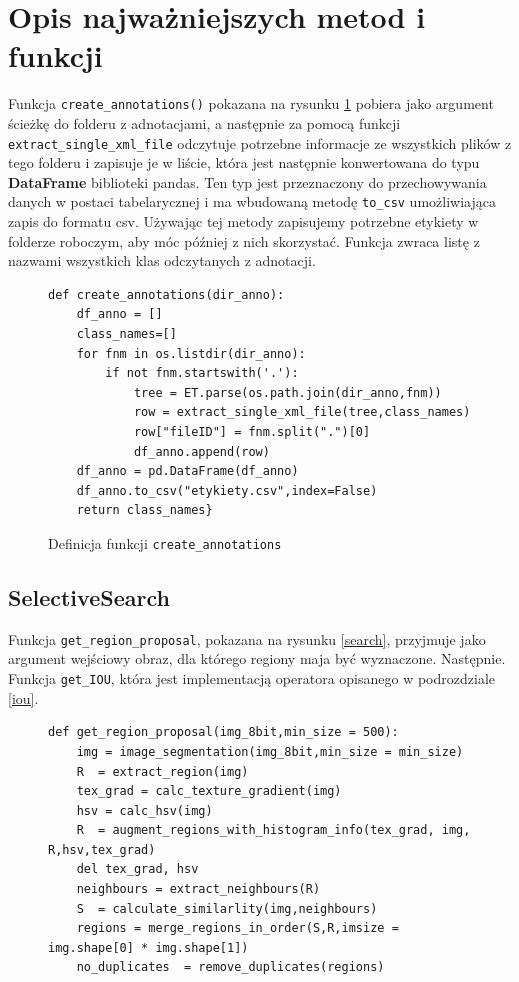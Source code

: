 \documentclass[a4paper,twoside,12pt]{book}
\begin{document}
{{\section{Opis najważniejszych metod i funkcji}
{ Funkcja \lstinline|create_annotations()| pokazana na rysunku \ref{dataprep} pobiera jako argument ścieżkę do folderu z adnotacjami, a następnie za pomocą funkcji \lstinline|extract_single_xml_file| odczytuje potrzebne informacje ze wszystkich plików z tego folderu  i zapisuje je w liście, która jest następnie konwertowana do typu \textbf{DataFrame} biblioteki pandas. Ten typ jest przeznaczony do przechowywania danych w postaci tabelarycznej i ma wbudowaną metodę \lstinline|to_csv| umożliwiająca zapis do formatu csv. Używając tej metody zapisujemy potrzebne etykiety w folderze roboczym, aby móc później z nich skorzystać. Funkcja zwraca listę z nazwami wszystkich klas odczytanych z adnotacji.}
\begin{figure}
\centering
\begin{lstlisting}
def create_annotations(dir_anno):
    df_anno = []
    class_names=[]
    for fnm in os.listdir(dir_anno):  
        if not fnm.startswith('.'):
            tree = ET.parse(os.path.join(dir_anno,fnm))
            row = extract_single_xml_file(tree,class_names)
            row["fileID"] = fnm.split(".")[0]
            df_anno.append(row)
    df_anno = pd.DataFrame(df_anno)
    df_anno.to_csv("etykiety.csv",index=False)
    return class_names}

\end{lstlisting}
\caption{Definicja funkcji \lstinline|create_annotations|}
\label{dataprep}
\end{figure}
\subsection{SelectiveSearch}
 Funkcja  \lstinline|get_region_proposal|, pokazana na rysunku \ref{search}, przyjmuje jako argument wejściowy obraz, dla którego regiony maja być wyznaczone. Następnie. Funkcja \lstinline|get_IOU|, która jest implementacją operatora opisanego w podrozdziale \ref{iou}.
}
\begin{figure}
\centering
\begin{lstlisting}
def get_region_proposal(img_8bit,min_size = 500):
    img = image_segmentation(img_8bit,min_size = min_size)
    R  = extract_region(img)    
    tex_grad = calc_texture_gradient(img)
    hsv = calc_hsv(img)
    R  = augment_regions_with_histogram_info(tex_grad, img, R,hsv,tex_grad)
    del tex_grad, hsv
    neighbours = extract_neighbours(R)
    S  = calculate_similarlity(img,neighbours)
    regions = merge_regions_in_order(S,R,imsize = img.shape[0] * img.shape[1])
    no_duplicates  = remove_duplicates(regions)


\end{lstlisting}
\end{figure}}
\end{document}
